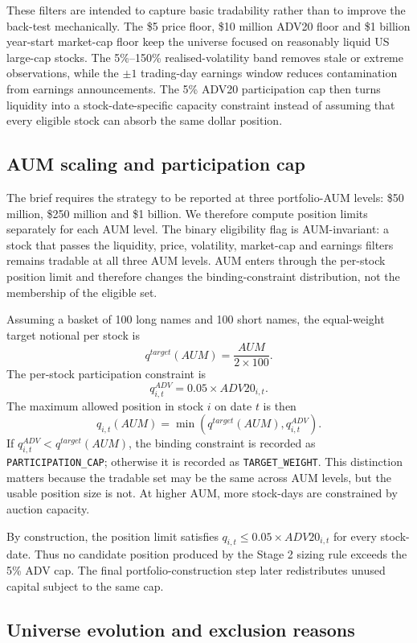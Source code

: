 \documentclass[12pt]{article}
\begin{document}
These filters are intended to capture basic tradability rather than to improve the back-test mechanically. The \$5 price floor, \$10 million ADV20 floor and \$1 billion year-start market-cap floor keep the universe focused on reasonably liquid US large-cap stocks. The 5\%--150\% realised-volatility band removes stale or extreme observations, while the $\pm 1$ trading-day earnings window reduces contamination from earnings announcements. The 5\% ADV20 participation cap then turns liquidity into a stock-date-specific capacity constraint instead of assuming that every eligible stock can absorb the same dollar position.

\subsection{AUM scaling and participation cap}

The brief requires the strategy to be reported at three portfolio-AUM levels: \$50 million, \$250 million and \$1 billion. We therefore compute position limits separately for each AUM level. The binary eligibility flag is AUM-invariant: a stock that passes the liquidity, price, volatility, market-cap and earnings filters remains tradable at all three AUM levels. AUM enters through the per-stock position limit and therefore changes the binding-constraint distribution, not the membership of the eligible set.

Assuming a basket of 100 long names and 100 short names, the equal-weight target notional per stock is
\[
q^{target}(AUM) = \frac{AUM}{2 \times 100}.
\]
The per-stock participation constraint is
\[
q^{ADV}_{i,t} = 0.05 \times ADV20_{i,t}.
\]
The maximum allowed position in stock $i$ on date $t$ is then
\[
q_{i,t}(AUM) =
\min\left(
q^{target}(AUM), q^{ADV}_{i,t}
\right).
\]
If $q^{ADV}_{i,t} < q^{target}(AUM)$, the binding constraint is recorded as \texttt{PARTICIPATION\_CAP}; otherwise it is recorded as \texttt{TARGET\_WEIGHT}. This distinction matters because the tradable set may be the same across AUM levels, but the usable position size is not. At higher AUM, more stock-days are constrained by auction capacity.

By construction, the position limit satisfies $q_{i,t} \leq 0.05 \times ADV20_{i,t}$ for every stock-date. Thus no candidate position produced by the Stage 2 sizing rule exceeds the 5\% ADV cap. The final portfolio-construction step later redistributes unused capital subject to the same cap.

\subsection{Universe evolution and exclusion reasons}
\end{document}
